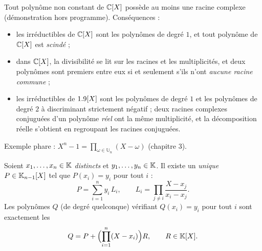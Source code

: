 
\begin{theoreme}
Tout polynôme non constant de $\mathbb{C}[X]$ possède au moins une racine
complexe (démonstration hors programme). Conséquences :
\begin{itemize}[label={\color{otNavy}\textbullet},leftmargin=1.4em,itemsep=0.6mm,topsep=0.8mm]
  \item les irréductibles de $\mathbb{C}[X]$ sont les polynômes de degré $1$, et
    tout polynôme de $\mathbb{C}[X]$ est \emph{scindé} ;
  \item dans $\mathbb{C}[X]$, la divisibilité se lit sur les racines et les
    multiplicités, et deux polynômes sont premiers entre eux si et
    seulement s'ils n'ont \emph{aucune racine commune} ;
  \item les irréductibles de $1.9[X]$ sont les polynômes de degré $1$ et
    les polynômes de degré $2$ à discriminant strictement négatif ; deux
    racines complexes conjuguées d'un polynôme \emph{réel} ont la même
    multiplicité, et la décomposition réelle s'obtient en regroupant les
    racines conjuguées.
\end{itemize}
Exemple phare : $X^{n}-1=\displaystyle\prod_{\omega\in\mathbb{U}_n}(X-\omega)$
(chapitre 3).
\end{theoreme}


\noindent
\begin{minipage}[c]{0.56\linewidth}
\begin{theoreme}
Soient $x_1,\dots,x_n\in\mathbb{K}$ \emph{distincts} et $y_1,\dots,y_n\in\mathbb{K}$. Il
existe un \emph{unique} $P\in\mathbb{K}_{n-1}[X]$ tel que $P(x_i)=y_i$ pour tout
$i$ :
\[
  P=\sum_{i=1}^{n}y_i\,L_i,\qquad
  L_i=\prod_{j\neq i}\frac{X-x_j}{x_i-x_j}.
\]
Les polynômes $Q$ (de degré quelconque) vérifiant $Q(x_i)=y_i$ pour tout
$i$ sont exactement les
\[
  Q=P+\Bigl(\prod_{i=1}^{n}(X-x_i)\Bigr)R,\qquad R\in\mathbb{K}[X].
\]
\end{theoreme}
\end{minipage}\hfill
\begin{minipage}[c]{0.4\linewidth}
\centering
{}\\[0.5mm]
\end{minipage}

